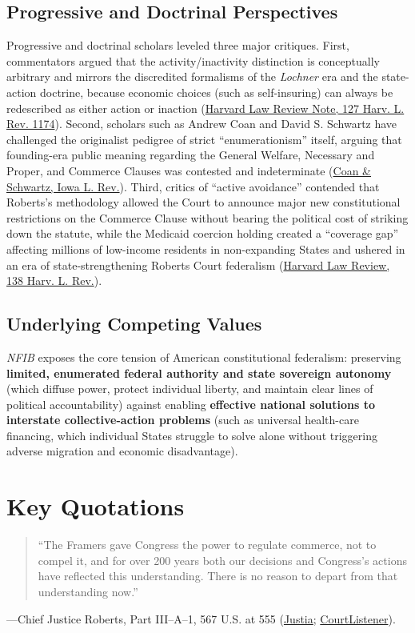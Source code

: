 \documentclass[12pt]{article}
\begin{document}
\subsection{Progressive and Doctrinal Perspectives}
Progressive and doctrinal scholars leveled three major critiques. First, commentators argued that the activity/inactivity distinction is conceptually arbitrary and mirrors the discredited formalisms of the \textit{Lochner} era and the state-action doctrine, because economic choices (such as self-insuring) can always be redescribed as either action or inaction (\href{https://harvardlawreview.org/wp-content/uploads/2014/02/vol127_nfib_v_sebelius.pdf}{Harvard Law Review Note, 127 Harv. L. Rev. 1174}). Second, scholars such as Andrew Coan and David S. Schwartz have challenged the originalist pedigree of strict ``enumerationism'' itself, arguing that founding-era public meaning regarding the General Welfare, Necessary and Proper, and Commerce Clauses was contested and indeterminate (\href{https://ilr.law.uiowa.edu/sites/ilr.law.uiowa.edu/files/2024-03/ILR-109-Coan-Schwartz_0.pdf}{Coan \& Schwartz, Iowa L. Rev.}). Third, critics of ``active avoidance'' contended that Roberts's methodology allowed the Court to announce major new constitutional restrictions on the Commerce Clause without bearing the political cost of striking down the statute, while the Medicaid coercion holding created a ``coverage gap'' affecting millions of low-income residents in non-expanding States and ushered in an era of state-strengthening Roberts Court federalism (\href{https://harvardlawreview.org/print/vol-138/federalism-rebalancing-and-the-roberts-court-a-departure-from-historical-patterns/}{Harvard Law Review, 138 Harv. L. Rev.}).

\subsection{Underlying Competing Values}
\textit{NFIB} exposes the core tension of American constitutional federalism: preserving \textbf{limited, enumerated federal authority and state sovereign autonomy} (which diffuse power, protect individual liberty, and maintain clear lines of political accountability) against enabling \textbf{effective national solutions to interstate collective-action problems} (such as universal health-care financing, which individual States struggle to solve alone without triggering adverse migration and economic disadvantage).

\section{Key Quotations}
\begin{quote}
``The Framers gave Congress the power to regulate commerce, not to compel it, and for over 200 years both our decisions and Congress's actions have reflected this understanding. There is no reason to depart from that understanding now.''
\end{quote}
---Chief Justice Roberts, Part III--A--1, 567 U.S. at 555 (\href{https://supreme.justia.com/cases/federal/us/567/519/}{Justia}; \href{https://www.courtlistener.com/opinion/809122/national-federation-of-independent-business-v-sebelius/}{CourtListener}).
\end{document}
